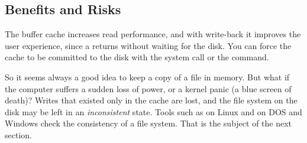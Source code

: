 \subsection{Benefits and Risks}

The buffer cache increases read performance, and with write-back it improves the user experience, since a  returns without waiting for the disk. You can force the cache to be committed to the disk with the  system call or the  command.

So it seems always a good idea to keep a copy of a file in memory. But what if the computer suffers a sudden loss of power, or a kernel panic (a blue screen of death)? Writes that existed only in the cache are lost, and the file system on the disk may be left in an \emph{inconsistent} state. Tools such as  on Linux and  on DOS and Windows check the consistency of a file system. That is the subject of the next section.
